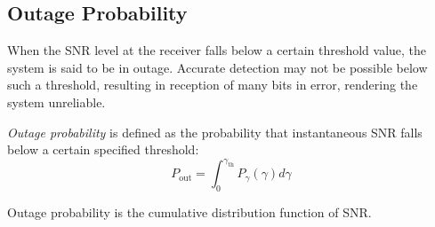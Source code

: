 \subsection{Outage Probability}
When the \gls{SNR} level at the receiver falls below a certain threshold value, the system is said to be in outage. Accurate detection may not be possible below such a threshold, resulting in reception of many bits in error, rendering the system unreliable\cite{MIMO}.

\emph{Outage probability} is defined as the probability that instantaneous SNR falls below a certain specified threshold:
\[
	P_{\text{out}} = \int_0^{\gamma_{\text{th}}} P_\gamma (\gamma) d\gamma
\]
\begin{mathDef}
\end{mathDef}
Outage probability is the cumulative distribution function of SNR.
